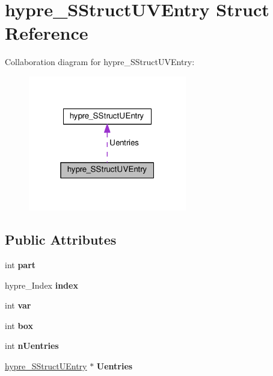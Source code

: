 \hypertarget{structhypre__SStructUVEntry}{}\section{hypre\+\_\+\+S\+Struct\+U\+V\+Entry Struct Reference}
\label{structhypre__SStructUVEntry}


Collaboration diagram for hypre\+\_\+\+S\+Struct\+U\+V\+Entry\+:
\nopagebreak
\begin{figure}[H]
\begin{center}
\leavevmode
\includegraphics[width=196pt]{structhypre__SStructUVEntry__coll__graph}
\end{center}
\end{figure}
\subsection*{Public Attributes}
\begin{DoxyCompactItemize}
\item 
\hypertarget{structhypre__SStructUVEntry_af71e15331182a5378a48526ee0178146}{}int {\bfseries part}\label{structhypre__SStructUVEntry_af71e15331182a5378a48526ee0178146}

\item 
\hypertarget{structhypre__SStructUVEntry_a97814c774d7204d5a577a070b5eef100}{}hypre\+\_\+\+Index {\bfseries index}\label{structhypre__SStructUVEntry_a97814c774d7204d5a577a070b5eef100}

\item 
\hypertarget{structhypre__SStructUVEntry_a267d80e4282c8f268bc975c10ced4a1b}{}int {\bfseries var}\label{structhypre__SStructUVEntry_a267d80e4282c8f268bc975c10ced4a1b}

\item 
\hypertarget{structhypre__SStructUVEntry_a9cbb5548bea84181d53215987b2a8774}{}int {\bfseries box}\label{structhypre__SStructUVEntry_a9cbb5548bea84181d53215987b2a8774}

\item 
\hypertarget{structhypre__SStructUVEntry_a45562a2cc3d1ee6c1b922a2906da6fe8}{}int {\bfseries n\+Uentries}\label{structhypre__SStructUVEntry_a45562a2cc3d1ee6c1b922a2906da6fe8}

\item 
\hypertarget{structhypre__SStructUVEntry_af4a2ef200a17b73be20c2d48ab80fcf6}{}\hyperlink{structhypre__SStructUEntry}{hypre\+\_\+\+S\+Struct\+U\+Entry} $\ast$ {\bfseries Uentries}\label{structhypre__SStructUVEntry_af4a2ef200a17b73be20c2d48ab80fcf6}

\end{DoxyCompactItemize}


